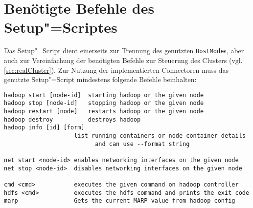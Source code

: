 \chapter{Benötigte Befehle des Setup"=Scriptes}
\label{app:setupScriptCmds}

Das Setup"=Script dient einerseits zur Trennung des genutzten \texttt{HostMode}s, aber auch zur Vereinfachung der benötigten Befehle zur Steuerung des Clusters (vgl. \cref{sec:realCluster}).
Zur Nutzung der implementierten Connectoren muss das genutzte Setup"=Script mindestens folgende Befehle beinhalten:

\begin{lstlisting}[label=lst:setupscriptHelp,style=plain,
caption={[Benötigte Befehle eines Setup"=Scriptes]
    Benötigte Befehle eines Setup"=Scriptes.
    Das Setup"=Script des \mbox{\texttt{Multihost}}"=Modes bietet zum Teil andere Befehle an, besitzt jedoch entsprechende Befehle zur vollständigen Kompatibilität.}]
hadoop start [node-id]  starting hadoop or the given node
hadoop stop [node-id]   stopping hadoop or the given node
hadoop restart [node]   restarts hadoop or the given node
hadoop destroy          destroys hadoop
hadoop info [id] [form]
                    list running containers or node container details
                          and can use --format string

net start <node-id> enables networking interfaces on the given node
net stop <node-id>  disables networking interfaces on the given node

cmd <cmd>           executes the given command on hadoop controller
hdfs <cmd>          executes the hdfs command and prints the exit code
marp                Gets the current MARP value from hadoop config
\end{lstlisting}

